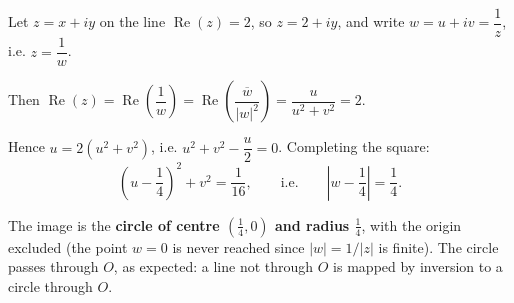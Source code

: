 \documentclass[11pt]{article}
\begin{document}
\begin{corrige}[Exercise 8 — Transformation $w = 1/z$]
Let $z = x + iy$ on the line $\operatorname{Re}(z) = 2$, so $z = 2 + iy$, and write $w = u + iv = \dfrac{1}{z}$, i.e. $z = \dfrac{1}{w}$.

Then $\operatorname{Re}(z) = \operatorname{Re}\left(\dfrac{1}{w}\right) = \operatorname{Re}\left(\dfrac{\overline{w}}{|w|^2}\right) = \dfrac{u}{u^2+v^2} = 2$.

Hence $u = 2(u^2 + v^2)$, i.e. $u^2 + v^2 - \dfrac{u}{2} = 0$. Completing the square:
\[ \left(u - \frac14\right)^2 + v^2 = \frac{1}{16}, \qquad\text{i.e.}\qquad \left|w - \frac14\right| = \frac14. \]

The image is the \textbf{circle of centre $\left(\tfrac14, 0\right)$ and radius $\tfrac14$}, with the origin excluded (the point $w=0$ is never reached since $|w| = 1/|z|$ is finite). The circle passes through $O$, as expected: a line not through $O$ is mapped by inversion to a circle through $O$.
\end{corrige}
\end{document}
